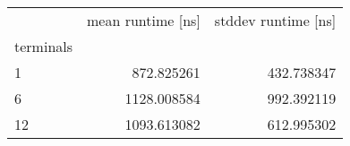 \begin{tabular}{lrr}
\toprule
{} &  mean runtime [ns] &  stddev runtime [ns] \\
terminals &                    &                      \\
\midrule
1         &         872.825261 &           432.738347 \\
6         &        1128.008584 &           992.392119 \\
12        &        1093.613082 &           612.995302 \\
\bottomrule
\end{tabular}
